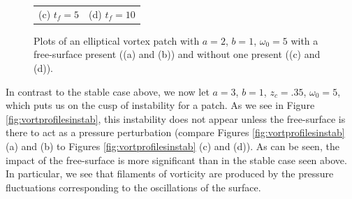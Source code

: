 \documentclass[a4paper,11pt]{article}
\begin{document}
\begin{figure}[!h]
\begin{tabular}{cc}
(c) $t_{f}=5$& (d) $t_{f}=10$
\end{tabular}	
\caption{Plots of an elliptical vortex patch with $a=2$, $b=1$, $\omega_{0}=5$ with a free-surface present ((a) and (b)) and without one present ((c) and (d)).  }
\label{fig:vortprofilesstab}
\end{figure}  

In contrast to the stable case above, we now let $a=3$, $b=1$, $z_{c}=.35$, $\omega_{0}=5$, which puts us on the cusp of  instability for a patch.  As we see in Figure \ref{fig:vortprofilesinstab}, this instability does not appear unless the free-surface is there to act as a pressure perturbation (compare Figures \ref{fig:vortprofilesinstab} (a) and (b) to Figures \ref{fig:vortprofilesinstab} (c) and (d)).  As can be seen, the impact of the free-surface is more significant than in the stable case seen above.  In particular, we see that filaments of vorticity are produced by the pressure fluctuations corresponding to the oscillations of the surface.  
\end{document}
